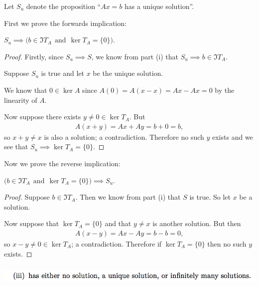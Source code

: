 \documentclass[12pt]{article}
\begin{document}
Let $S_u$ denote the proposition ``$Ax = b$ has a unique solution''.

First we prove the forwards implication:

\begin{claim*}
  $S_u \implies \Big(b \in \Im T_A ~~\text{and}~~ \ker T_A = \{0\}\Big)$.
\end{claim*}

\begin{proof}
Firstly, since $S_u \implies S$, we know from part (i) that
$S_u \implies b \in \Im T_A$.

Suppose $S_u$ is true and let $x$ be the unique solution.

We know that $0 \in \ker A$ since $A(0) = A(x - x) = Ax - Ax = 0$ by the
linearity of $A$.

Now suppose there exists $y \neq 0 \in \ker T_A$. But
\begin{align*}
A(x + y) = Ax + Ay = b + 0 = b,
\end{align*}
so $x + y \neq x$ is also a solution; a contradiction. Therefore no such $y$
exists and we see that $S_u \implies \ker T_A = \{0\}$.
\end{proof}

Now we prove the reverse implication:

\begin{claim*}
  $\Big(b \in \Im T_A ~~\text{and}~~ \ker T_A = \{0\}\Big) \implies S_u$.
\end{claim*}

\begin{proof}
  Suppose $b \in \Im T_A$. Then we know from part (i) that $S$ is true. So let
  $x$ be a solution.

Now suppose that $\ker T_A = \{0\}$ and that $y \neq x$ is another solution. But then
\begin{align*}
  A(x - y) = Ax - Ay = b - b = 0,
\end{align*}
so $x - y \neq 0 \in \ker T_A$; a contradiction. Therefore if $\ker T_A = \{0\}$
then no such $y$ exists.
\end{proof}

\subsubsection*{} %
\begin{mdframed}
\includegraphics[width=400pt]{img/oxford-prelims-2017-A-2-1-3.png}
\end{mdframed}
\end{document}
